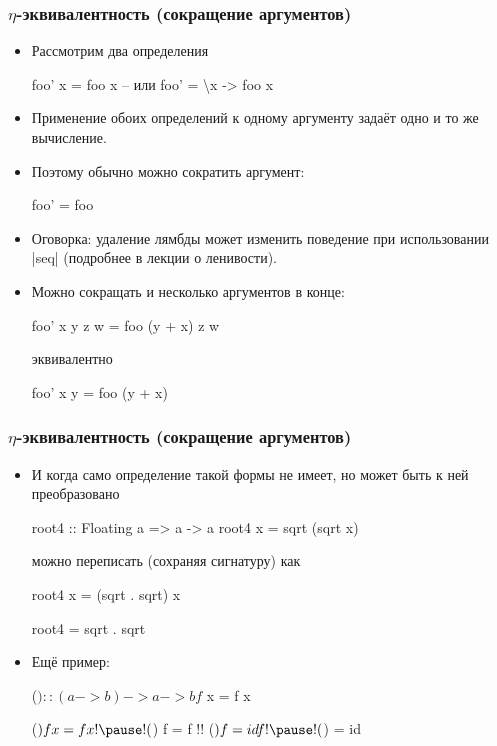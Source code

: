 \documentclass[10pt]{beamer}
\begin{document}
\begin{frame}[fragile]
  \frametitle{$\eta$-эквивалентность (сокращение аргументов)}
  \begin{itemize}
    \item Рассмотрим два определения
          \begin{haskell}
            foo' x = foo x
            -- или foo' = \textbackslash x -> foo x 
          \end{haskell}
    \item Применение обоих определений к одному аргументу задаёт одно и то же вычисление.\pause
    \item Поэтому обычно можно сократить аргумент:
          \begin{haskell}
            foo' = foo
          \end{haskell}
\pause
    \item Оговорка: удаление лямбды может изменить поведение при использовании \haskinline|seq| (подробнее в лекции о ленивости).
    \item Можно сокращать и несколько аргументов в конце:
          \begin{haskell}
            foo' x y z w = foo (y + x) z w
          \end{haskell}
          эквивалентно
          \begin{haskell}
            foo' x y = foo (y + x)
          \end{haskell}
  \end{itemize}
\end{frame}

\begin{frame}[fragile]
  \frametitle{$\eta$-эквивалентность (сокращение аргументов)}
  \begin{itemize}
    \item И когда само определение такой формы не имеет, но может быть к ней преобразовано
          \begin{haskell}
            root4 :: Floating a => a -> a
            root4 x = sqrt (sqrt x)
          \end{haskell}
          можно переписать (сохраняя сигнатуру) как
          \begin{haskell}
            root4 x = (sqrt . sqrt) x

            root4 = sqrt . sqrt
          \end{haskell}
    \item Ещё пример:
          \begin{haskell}
            ($) :: (a -> b) -> a -> b
            f $ x = f x

            ($) f x = f x !\pause!
            ($) f = f !\pause!
            ($) f = id f !\pause!
            ($) = id
          \end{haskell}
  \end{itemize}
\end{frame}
\end{document}
